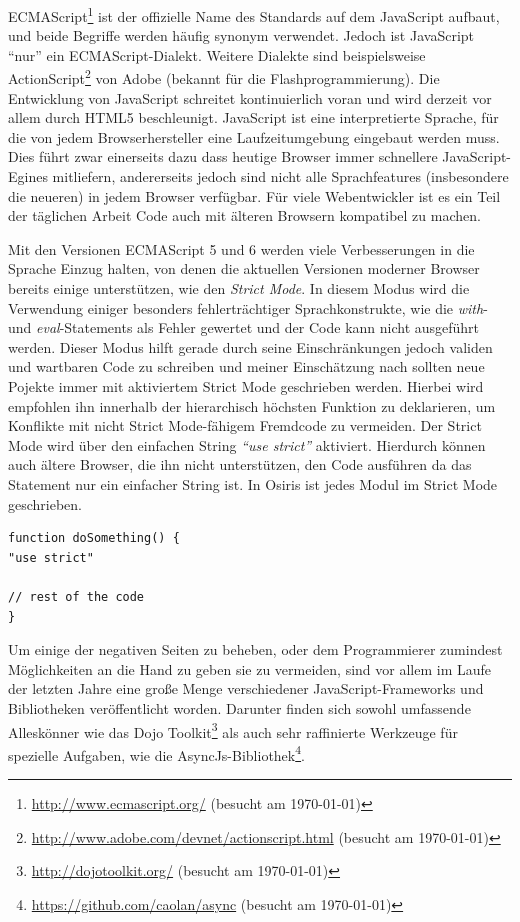 ECMAScript\footnote{\url{http://www.ecmascript.org/} (besucht am \today)} ist der offizielle Name des Standards auf dem JavaScript aufbaut, und beide Begriffe werden häufig synonym verwendet. Jedoch ist JavaScript "`nur"' ein ECMAScript-Dialekt. Weitere Dialekte sind beispielsweise ActionScript\footnote{\url{http://www.adobe.com/devnet/actionscript.html} (besucht am \today)} von Adobe (bekannt für die Flashprogrammierung). Die Entwicklung von JavaScript schreitet kontinuierlich voran und wird derzeit vor allem durch HTML5 beschleunigt. JavaScript ist eine interpretierte Sprache, für die von jedem Browserhersteller eine Laufzeitumgebung eingebaut werden muss. Dies führt zwar einerseits dazu dass heutige Browser immer schnellere JavaScript-Egines mitliefern, andererseits jedoch sind nicht alle Sprachfeatures (insbesondere die neueren) in jedem Browser verfügbar. Für viele Webentwickler ist es ein Teil der täglichen Arbeit Code auch mit älteren Browsern kompatibel zu machen.

Mit den Versionen ECMAScript 5 und 6 werden viele Verbesserungen in die Sprache Einzug halten, von denen die aktuellen Versionen moderner Browser bereits einige unterstützen, wie den \textit{Strict Mode}. In diesem Modus wird die Verwendung einiger besonders fehlerträchtiger Sprachkonstrukte, wie die \textit{with}- und \textit{eval}-Statements als Fehler gewertet und der Code kann nicht ausgeführt werden. Dieser Modus hilft gerade durch seine Einschränkungen jedoch validen und wartbaren Code zu schreiben und meiner Einschätzung nach sollten neue Pojekte immer mit aktiviertem Strict Mode geschrieben werden. Hierbei wird empfohlen ihn innerhalb der hierarchisch höchsten Funktion zu deklarieren, um Konflikte mit nicht Strict Mode-fähigem Fremdcode zu vermeiden. Der Strict Mode wird über den einfachen String \textit{"`use strict"'} aktiviert. Hierdurch können auch ältere Browser, die ihn nicht unterstützen, den Code ausführen da das Statement nur ein einfacher String ist. In Osiris ist jedes Modul im Strict Mode geschrieben.
\lstset{language=JavaScript}
\begin{lstlisting}[caption={Aktivierung des \textit{Strict Mode}}]
function doSomething() {
"use strict"

// rest of the code
}
\end{lstlisting}
Um einige der negativen Seiten zu beheben, oder dem Programmierer zumindest Möglichkeiten an die Hand zu geben sie zu vermeiden, sind vor allem im Laufe der letzten Jahre eine große Menge verschiedener JavaScript-Frameworks und Bibliotheken veröffentlicht worden. Darunter finden sich sowohl umfassende Alleskönner wie das Dojo Toolkit\footnote{\url{http://dojotoolkit.org/} (besucht am \today)} als auch sehr raffinierte Werkzeuge für spezielle Aufgaben, wie die AsyncJs-Bibliothek\footnote{\url{https://github.com/caolan/async} (besucht am \today)}.

